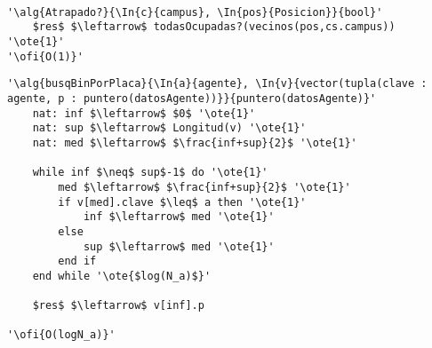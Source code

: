 \begin{lstlisting}[mathescape]

'\alg{Atrapado?}{\In{c}{campus}, \In{pos}{Posicion}}{bool}'
	$res$ $\leftarrow$ todasOcupadas?(vecinos(pos,cs.campus)) '\ote{1}'
'\ofi{O(1)}'

\end{lstlisting}

\begin{lstlisting}[mathescape]
'\alg{busqBinPorPlaca}{\In{a}{agente}, \In{v}{vector(tupla(clave : agente, p : puntero(datosAgente))}}{puntero(datosAgente)}'
	nat: inf $\leftarrow$ $0$ '\ote{1}'
	nat: sup $\leftarrow$ Longitud(v) '\ote{1}'
	nat: med $\leftarrow$ $\frac{inf+sup}{2}$ '\ote{1}'

	while inf $\neq$ sup$-1$ do '\ote{1}'
		med $\leftarrow$ $\frac{inf+sup}{2}$ '\ote{1}'
		if v[med].clave $\leq$ a then '\ote{1}'
			inf $\leftarrow$ med '\ote{1}'
		else
			sup $\leftarrow$ med '\ote{1}'
		end if
	end while '\ote{$log(N_a)$}'

	$res$ $\leftarrow$ v[inf].p

'\ofi{O(logN_a)}'
\end{lstlisting}
